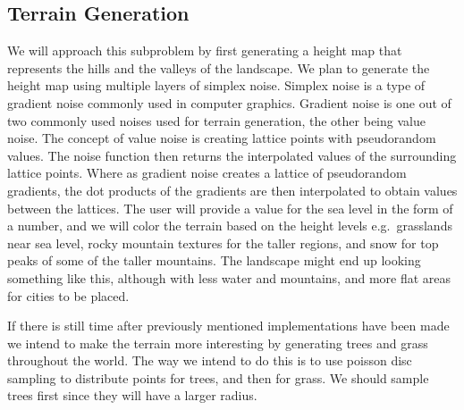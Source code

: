 \subsection{Terrain Generation}
We will approach this subproblem by first generating a height map that represents the hills and the valleys of the landscape. 
We plan to generate the height map using multiple layers of simplex noise.
Simplex noise is a type of gradient noise commonly used in computer graphics. 
Gradient noise is one out of two commonly used noises used for terrain generation, the other being value noise.  
The concept of value noise is creating lattice points with pseudorandom values. 
The noise function then returns the interpolated values of the surrounding lattice points. 
Where as gradient noise creates a lattice of pseudorandom gradients, the dot products of the gradients are then interpolated to obtain values between the lattices. 
The user will provide a value for the sea level in the form of a number, and we will color the terrain based on the height levels e.g.\ grasslands near sea level, rocky mountain textures for the taller regions, and snow for top peaks of some of the taller mountains.
The landscape might end up looking something like this, although with less water and mountains, and more flat areas for cities to be placed.

If there is still time after previously mentioned implementations have been made we intend to make the terrain more interesting by generating trees and grass throughout the world.
The way we intend to do this is to use poisson disc sampling to distribute points for trees, and then for grass. %
We should sample trees first since they will have a larger radius.  